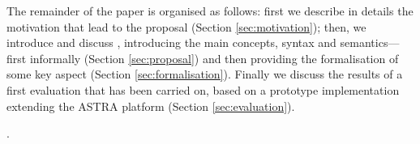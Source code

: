 The remainder of the paper is organised as follows:
%
first we describe in details the motivation that lead to the proposal (Section \ref{sec:motivation});
%
then, we introduce and discuss {\aser},  introducing the main concepts, syntax and semantics---first informally  (Section \ref{sec:proposal}) and then providing the formalisation of some key aspect (Section \ref{sec:formalisation}).
%
Finally we discuss the results of a first evaluation that has been carried on, based on a prototype implementation extending the ASTRA platform (Section \ref{sec:evaluation}).
%


.
